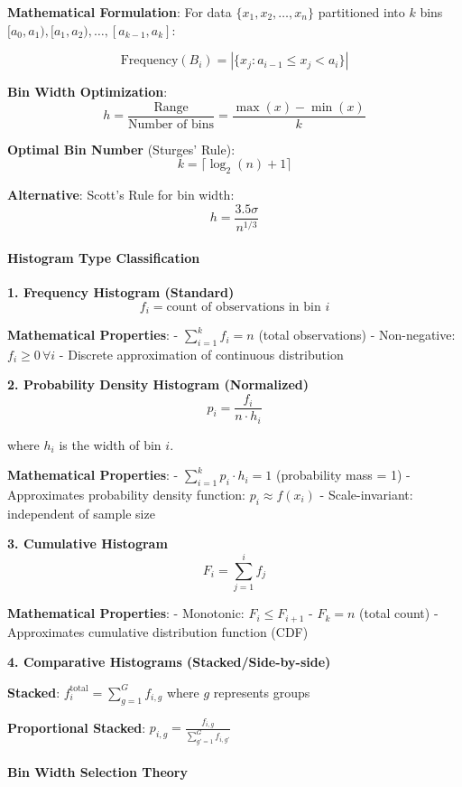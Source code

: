 \documentclass[11pt]{article}
\begin{document}
\textbf{Mathematical Formulation}: For data
\(\{x_1, x_2, \ldots, x_n\}\) partitioned into \(k\) bins
\([a_0, a_1), [a_1, a_2), \ldots, [a_{k-1}, a_k]\):

\[\text{Frequency}(B_i) = |\{x_j : a_{i-1} \leq x_j < a_i\}|\]

\textbf{Bin Width Optimization}:
\[h = \frac{\text{Range}}{\text{Number of bins}} = \frac{\max(x) - \min(x)}{k}\]

\textbf{Optimal Bin Number} (Sturges' Rule):
\[k = \lceil \log_2(n) + 1 \rceil\]

\textbf{Alternative}: Scott's Rule for bin width:
\[h = \frac{3.5 \sigma}{n^{1/3}}\]

\paragraph{Histogram Type
Classification}\label{histogram-type-classification}

\textbf{1. Frequency Histogram (Standard)}
\[f_i = \text{count of observations in bin } i\]

\textbf{Mathematical Properties}: - \(\sum_{i=1}^{k} f_i = n\) (total
observations) - Non-negative: \(f_i \geq 0 \, \forall i\) - Discrete
approximation of continuous distribution

\textbf{2. Probability Density Histogram (Normalized)}
\[p_i = \frac{f_i}{n \cdot h_i}\]

where \(h_i\) is the width of bin \(i\).

\textbf{Mathematical Properties}: - \(\sum_{i=1}^{k} p_i \cdot h_i = 1\)
(probability mass = 1) - Approximates probability density function:
\(p_i \approx f(x_i)\) - Scale-invariant: independent of sample size

\textbf{3. Cumulative Histogram} \[F_i = \sum_{j=1}^{i} f_j\]

\textbf{Mathematical Properties}: - Monotonic: \(F_i \leq F_{i+1}\) -
\(F_k = n\) (total count) - Approximates cumulative distribution
function (CDF)

\textbf{4. Comparative Histograms (Stacked/Side-by-side)}

\textbf{Stacked}: \(f_i^{\text{total}} = \sum_{g=1}^{G} f_{i,g}\) where
\(g\) represents groups

\textbf{Proportional Stacked}:
\(p_{i,g} = \frac{f_{i,g}}{\sum_{g'=1}^{G} f_{i,g'}}\)

\paragraph{Bin Width Selection Theory}\label{bin-width-selection-theory}
\end{document}
